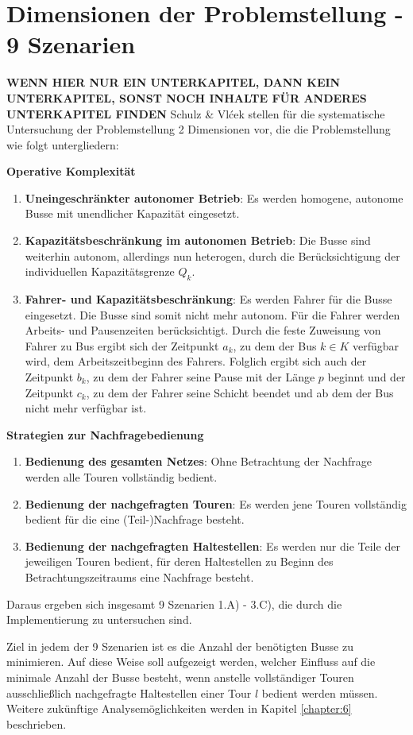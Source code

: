 \section{Dimensionen der Problemstellung - 9 Szenarien}
\textbf{WENN HIER NUR EIN UNTERKAPITEL, DANN KEIN UNTERKAPITEL, SONST NOCH INHALTE FÜR ANDERES UNTERKAPITEL FINDEN}
Schulz \& Vlćek stellen für die systematische Untersuchung der Problemstellung 2 Dimensionen vor, die die Problemstellung wie folgt untergliedern:

\textbf{Operative Komplexität}
\begin{enumerate}
    \item \textbf{Uneingeschränkter autonomer Betrieb}: Es werden homogene, autonome Busse mit unendlicher Kapazität eingesetzt.
    \item \textbf{Kapazitätsbeschränkung im autonomen Betrieb}: Die Busse sind weiterhin autonom, allerdings nun heterogen, durch die Berücksichtigung der individuellen Kapazitätsgrenze $Q_k$.
    \item \textbf{Fahrer- und Kapazitätsbeschränkung}: Es werden Fahrer für die Busse eingesetzt. Die Busse sind somit nicht mehr autonom. Für die Fahrer werden Arbeits- und Pausenzeiten berücksichtigt. Durch die feste Zuweisung von Fahrer zu Bus ergibt sich der Zeitpunkt $a_k$, zu dem der Bus $k \in K$ verfügbar wird, dem Arbeitszeitbeginn des Fahrers. Folglich ergibt sich auch der Zeitpunkt $b_k$, zu dem der Fahrer seine Pause mit der Länge $p$ beginnt und der Zeitpunkt $c_k$, zu dem der Fahrer seine Schicht beendet und ab dem der Bus nicht mehr verfügbar ist. 
\end{enumerate}
\textbf{Strategien zur Nachfragebedienung}
\begin{enumerate}[label=\Alph*)]
    \item \textbf{Bedienung des gesamten Netzes}: Ohne Betrachtung der Nachfrage werden alle Touren vollständig bedient.
    \item \textbf{Bedienung der nachgefragten Touren}: Es werden jene Touren vollständig bedient für die eine (Teil-)Nachfrage besteht.
    \item \textbf{Bedienung der nachgefragten Haltestellen}: Es werden nur die Teile der jeweiligen Touren bedient, für deren Haltestellen zu Beginn des Betrachtungszeitraums eine Nachfrage besteht.
\end{enumerate}

Daraus ergeben sich insgesamt 9 Szenarien 1.A) - 3.C), die durch die Implementierung zu untersuchen sind.

Ziel in jedem der 9 Szenarien ist es die Anzahl der benötigten Busse zu minimieren. Auf diese Weise soll aufgezeigt werden, welcher Einfluss auf die minimale Anzahl der Busse besteht, wenn anstelle vollständiger Touren ausschließlich nachgefragte Haltestellen einer Tour $l$ bedient werden müssen.
Weitere zukünftige Analysemöglichkeiten werden in Kapitel \ref{chapter:6} beschrieben.

